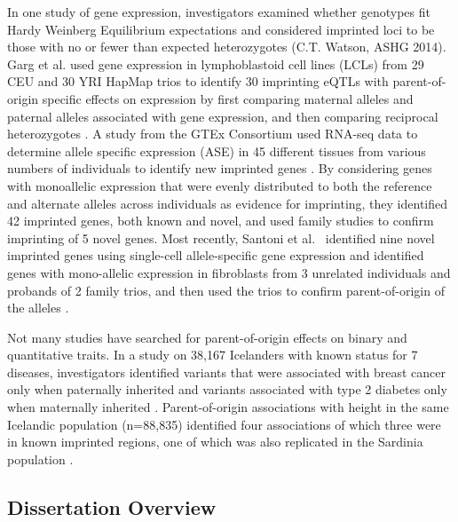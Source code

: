 In one study of gene expression, investigators examined whether genotypes fit Hardy Weinberg Equilibrium expectations and considered imprinted loci to be those with no or fewer than expected heterozygotes (C.T. Watson, ASHG 2014). Garg et al. used gene expression in lymphoblastoid cell lines (LCLs) from 29 CEU and 30 YRI HapMap trios to identify 30 imprinting eQTLs with parent-of-origin specific effects on expression by first comparing maternal alleles and paternal alleles associated with gene expression, and then comparing reciprocal heterozygotes \cite{Garg2012a}. A study from the GTEx Consortium used RNA-seq data to determine allele specific expression (ASE) in 45 different tissues from various numbers of individuals to identify new imprinted genes \cite{Baran:2015cx}. By considering genes with monoallelic expression that were evenly distributed to both the reference and alternate alleles across individuals as evidence for imprinting, they identified 42 imprinted genes, both known and novel, and used family studies to confirm imprinting of 5 novel genes. Most recently, Santoni et al.~ identified nine novel imprinted genes using single-cell allele-specific gene expression and identified genes with mono-allelic expression in fibroblasts from 3 unrelated individuals and probands of 2 family trios, and then used the trios to confirm parent-of-origin of the alleles \cite{Santoni:2017hu}.

Not many studies have searched for parent-of-origin effects on binary and quantitative traits. In a study on 38,167 Icelanders with known status for 7 diseases, investigators identified variants that were associated with breast cancer only when paternally inherited and variants associated with type 2 diabetes only when maternally inherited \cite{Kong:2009kk}. Parent-of-origin associations with height in the same Icelandic population (n=88,835) identified four associations of which three were in known imprinted regions, one of which was also replicated in the Sardinia population \cite{Zoledziewska:2015do}.

\subsection{Dissertation Overview}


